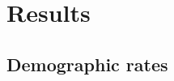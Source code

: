 \documentclass[12pt, oneside]{article}   	%
\begin{document}
\section*{Results} %



\subsection*{Demographic rates}
\end{document}
